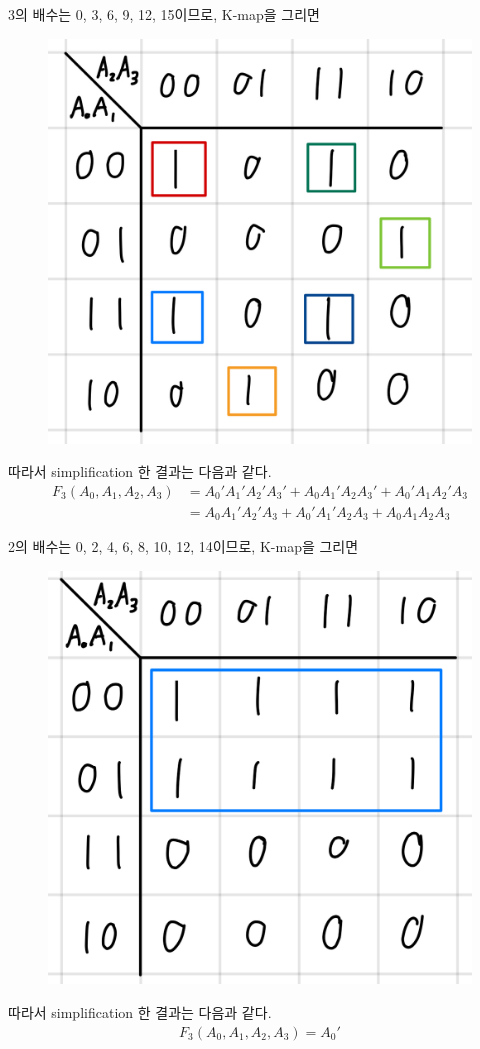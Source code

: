 \documentclass{scrartcl}
\begin{document}
3의 배수는 0, 3, 6, 9, 12, 15이므로, K-map을 그리면
\begin{figure}[H]
  \centering
  \includegraphics[width=0.3\linewidth]{lab3_2_3_km}
\end{figure}
따라서 simplification 한 결과는 다음과 같다.
\begin{align*}
  F_3(A_0, A_1, A_2, A_3) &= A_0' A_1' A_2' A_3' + A_0 A_1' A_2 A_3' + A_0' A_1 A_2' A_3 \\
                          &= A_0 A_1' A_2' A_3 + A_0' A_1' A_2 A_3 + A_0 A_1 A_2 A_3
\end{align*}

2의 배수는 0, 2, 4, 6, 8, 10, 12, 14이므로, K-map을 그리면
\begin{figure}[H]
  \centering
  \includegraphics[width=0.3\linewidth]{lab3_2_2_km}
\end{figure}
따라서 simplification 한 결과는 다음과 같다.
\begin{align*}
  F_3(A_0, A_1, A_2, A_3) = A_0'
\end{align*}
\end{document}
